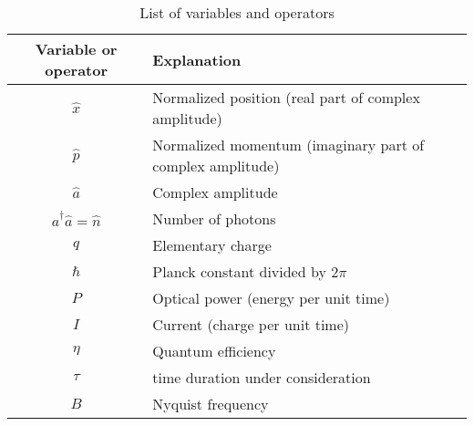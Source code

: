 \begin{table}
\caption{List of variables and operators}	
\begin{center}
\begin{tabular}{c l}
\hline
	Variable or operator & Explanation \\
	\hline \hline
	$\hat x$ & Normalized position (real part of complex amplitude)\\
	$\hat p$ & Normalized momentum (imaginary part of complex amplitude)\\
	$\hat a$ & Complex amplitude\\
	$\hat a ^\dagger \hat a = \hat n$ & Number of photons\\
	$q$ & Elementary charge\\
	$\hbar$ & Planck constant divided by $2\pi$\\
	$P$ & Optical power (energy per unit time)\\
	$I$ & Current (charge per unit time)\\
	$\eta$ & Quantum efficiency\\
	$\tau$ & time duration under consideration\\
	$B$ & Nyquist frequency\\
\hline
\end{tabular}
\label{table:variables}
\end{center}
\end{table}

